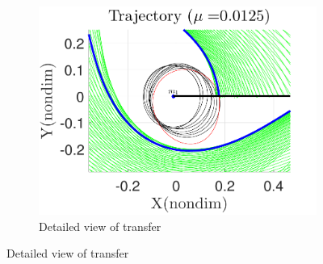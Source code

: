 \documentclass[smallcondensed]{svjour3}
\begin{document}
\begin{figure}
\begin{subfigure}[htbp]{0.5\textwidth}
                \includegraphics[width=\textwidth]{geo_transfer_zoom} 
                \caption{Detailed view of transfer} \label{fig:geo_transfer_zoom} 
        \end{subfigure} 
        

\end{figure}
\end{document}
